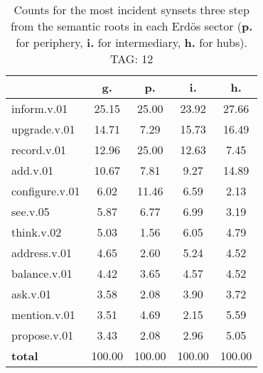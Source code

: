 \begin{table}[h!]
\begin{center}
\begin{tabular}{| l || c | c | c | c |}\hline
 & {\bf g.} & {\bf p.} & {\bf i.} & {\bf h.} \\\hline\hline
inform.v.01 & 25.15  & 25.00  & 23.92  & 27.66 \\\hline
upgrade.v.01 & 14.71  & 7.29  & 15.73  & 16.49 \\\hline
record.v.01 & 12.96  & 25.00  & 12.63  & 7.45 \\\hline
add.v.01 & 10.67  & 7.81  & 9.27  & 14.89 \\\hline
configure.v.01 & 6.02  & 11.46  & 6.59  & 2.13 \\\hline
see.v.05 & 5.87  & 6.77  & 6.99  & 3.19 \\\hline
think.v.02 & 5.03  & 1.56  & 6.05  & 4.79 \\\hline
address.v.01 & 4.65  & 2.60  & 5.24  & 4.52 \\\hline
balance.v.01 & 4.42  & 3.65  & 4.57  & 4.52 \\\hline
ask.v.01 & 3.58  & 2.08  & 3.90  & 3.72 \\\hline
mention.v.01 & 3.51  & 4.69  & 2.15  & 5.59 \\\hline
propose.v.01 & 3.43  & 2.08  & 2.96  & 5.05 \\\hline\hline
{{\bf total}} & 100.00  & 100.00  & 100.00  & 100.00 \\\hline
\end{tabular}
\caption{Counts for the most incident synsets three step from the semantic roots in each Erd\"os sector ({\bf p.} for periphery, {\bf i.} for intermediary, {\bf h.} for hubs). TAG: 12}
\end{center}
\end{table}